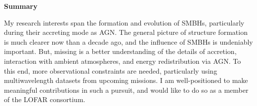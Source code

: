 \documentclass[12pt]{article}
\begin{document}
{\bf{Summary}}

My research interests span the formation and evolution of SMBHs,
particularly during their accreting mode as AGN. The general picture
of structure formation is much clearer now than a decade ago, and the
influence of SMBHs is undeniably important. But, missing is a better
understanding of the details of accretion, interaction with ambient
atmospheres, and energy redistribution via AGN. To this end, more
observational constraints are needed, particularly using
multiwavelength datasets from upcoming missions. I am well-positioned
to make meaningful contributions in such a pursuit, and would like to
do so as a member of the LOFAR consortium.

\scriptsize


 
\end{document}
